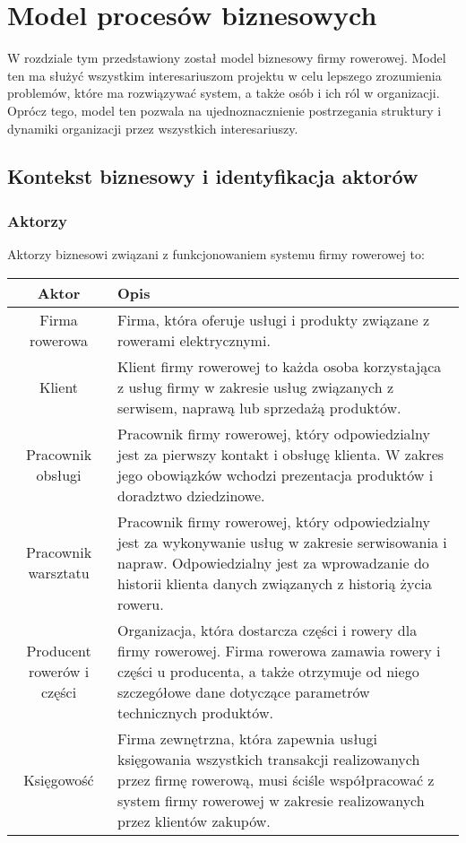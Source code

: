 \documentclass[a4paper,20pt]{article}
\begin{document}
\newpage
\section{Model procesów biznesowych}

W rozdziale tym przedstawiony został model biznesowy firmy rowerowej. Model ten ma służyć wszystkim interesariuszom projektu w celu lepszego zrozumienia problemów, które ma rozwiązywać system, a także osób i ich ról w organizacji. Oprócz tego, model ten pozwala na 	ujednoznacznienie postrzegania struktury i dynamiki organizacji przez wszystkich interesariuszy.

\subsection{Kontekst biznesowy i identyfikacja aktorów}


\subsubsection{Aktorzy}

Aktorzy biznesowi związani z funkcjonowaniem systemu firmy rowerowej to:

\begin{table}[h!]
\centering
 \begin{tabular}{||c || p{8cm}||} 
 \hline
 Aktor & Opis \\ [0.5ex] 
 \hline\hline
 Firma rowerowa & Firma, która oferuje usługi i produkty związane z rowerami elektrycznymi.  \\ \hline 
 Klient & Klient firmy rowerowej to każda osoba korzystająca z usług firmy w zakresie usług związanych z serwisem, naprawą lub sprzedażą produktów.  \\ \hline
 Pracownik obsługi & Pracownik firmy rowerowej, który odpowiedzialny jest za pierwszy kontakt i obsługę klienta. W zakres jego obowiązków wchodzi prezentacja produktów i doradztwo dziedzinowe.    \\ \hline
 Pracownik warsztatu &  Pracownik firmy rowerowej, który odpowiedzialny jest za wykonywanie usług w zakresie serwisowania i napraw. Odpowiedzialny jest za wprowadzanie do historii klienta danych związanych z historią życia roweru. \\ \hline
 Producent rowerów i części &  Organizacja, która dostarcza części i rowery dla firmy rowerowej. Firma rowerowa zamawia rowery i części u producenta, a także otrzymuje od niego szczegółowe dane dotyczące parametrów technicznych produktów. \\ \hline
 Księgowość & Firma zewnętrzna, która zapewnia usługi księgowania wszystkich transakcji realizowanych przez firmę rowerową, musi ściśle współpracować z system firmy rowerowej w zakresie realizowanych przez klientów zakupów.   
   \\ [1ex] 
 \hline
 \end{tabular}
\end{table}
\end{document}
